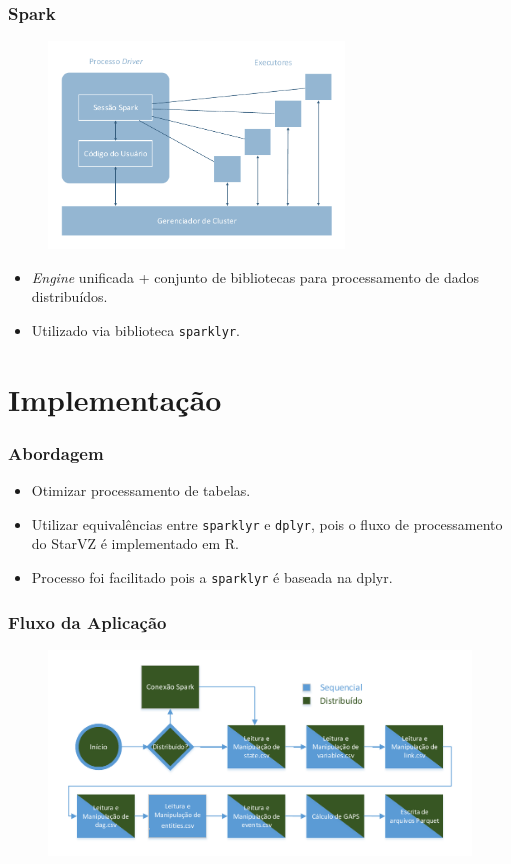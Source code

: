 \documentclass{beamer}
\begin{document}
\begin{frame}
 \frametitle{Spark}
 \begin{figure}[ht]
  \centerline{\includegraphics[width=0.7\textwidth]{./img/spark-arch.pdf}}
  \label{fig:spark-arch}
  \end{figure}
  \begin{itemize}
  \item \textit{Engine} unificada + conjunto de bibliotecas para processamento 
de dados distribuídos.
  \item Utilizado via biblioteca \texttt{sparklyr}.
  \end{itemize}
\end{frame}


\section{Implementação}
\begin{frame}
 \frametitle{Abordagem}
 \begin{itemize}
  \item Otimizar processamento de tabelas.
  \item Utilizar equivalências entre \texttt{sparklyr} e \texttt{dplyr}, pois o 
fluxo de processamento do StarVZ é implementado em R.
  \item Processo foi facilitado pois a \texttt{sparklyr} é baseada na {dplyr}.
 \end{itemize}
\end{frame}

\begin{frame}
 \frametitle{Fluxo da Aplicação}
 \begin{figure}[H]
 \centerline{\includegraphics[width=1\textwidth]{./img/applicationflow.pdf}}
 \label{fig:spark-starvz-flow}
 \end{figure}
\end{frame}
\end{document}
